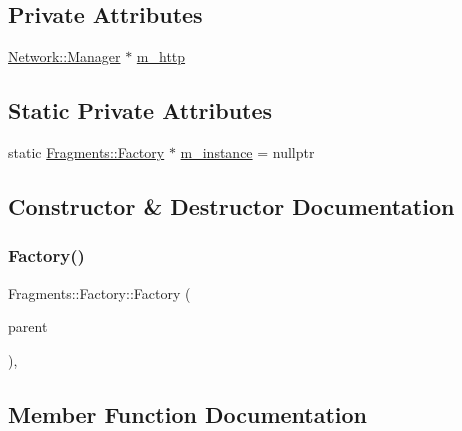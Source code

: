 \subsection*{Private Attributes}
\begin{DoxyCompactItemize}
\item 
\mbox{\hyperlink{classNetwork_1_1Manager}{Network\+::\+Manager}} $\ast$ \mbox{\hyperlink{classFragments_1_1Factory_aa98b2097fdc55511bdf4fc3bda37e98e}{m\+\_\+http}}
\end{DoxyCompactItemize}
\subsection*{Static Private Attributes}
\begin{DoxyCompactItemize}
\item 
static \mbox{\hyperlink{classFragments_1_1Factory}{Fragments\+::\+Factory}} $\ast$ \mbox{\hyperlink{classFragments_1_1Factory_a7e07aaa093813ab0e1cb50e92ac1386e}{m\+\_\+instance}} = nullptr
\end{DoxyCompactItemize}


\subsection{Constructor \& Destructor Documentation}
\mbox{\label{classFragments_1_1Factory_a04aefdf80a3318302fbb839b9322a12e}} 
\subsubsection{\texorpdfstring{Factory()}{Factory()}}
{\footnotesize\ttfamily Fragments\+::\+Factory\+::\+Factory (\begin{DoxyParamCaption}\item[{Q\+Object $\ast$}]{parent }\end{DoxyParamCaption})\hspace{0.3cm}{\ttfamily [explicit]}, {\ttfamily [private]}}



\subsection{Member Function Documentation}
\mbox{\label{classFragments_1_1Factory_ab8bdc67290ccbc5444d551fbebc68b17}} 

